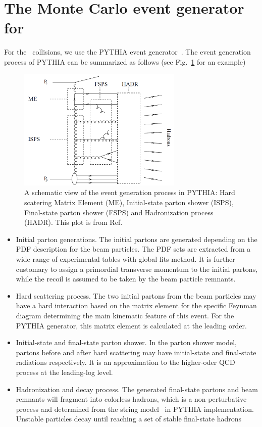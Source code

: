 \section{The Monte Carlo event generator for \ep\ } \label{sec:MC_ep}
For the \ep\ collisions, we use the PYTHIA event generator~\cite{Sjostrand:2006za}. The event generation
process of PYTHIA can be summarized as follows (see Fig.~\ref{fig:PYTHIA_generation_scheme} for an example)
\begin{figure}
\centering
\includegraphics[width=0.7\textwidth]{plots/chpt5/PYTHIA_generation_scheme.png} 
\caption[Event generation in PYTHIA] {
A schematic view of the event generation process in PYTHIA: Hard scatering Matrix Element (ME), 
Initial-state parton shower (ISPS), Final-state parton shower (FSPS) and Hadronization process (HADR). 
This plot is from Ref.~\cite{Hansson:2007zz} }
\label{fig:PYTHIA_generation_scheme}
\end{figure}
\begin{itemize}
\item Initial parton generations. The initial partons are generated depending
on the PDF description for the beam particles. The PDF sets are extracted from
a wide range of experimental tables with global fits method. It is further customary to assign a primordial transverse momentum to the initial partons, while the recoil is assumed to be taken by the beam particle remnants. 
\item Hard scattering process. The two initial partons from the beam particles may
have a hard interaction based on the matrix element for the specific Feynman diagram
determining the main kinematic feature of this event. For the PYTHIA generator, this
matrix element is calculated at the leading order.
\item Initial-state and final-state parton shower. In the parton shower model, partons
before and after hard scattering may have initial-state and final-state radiations respectively. It
is an approximation to the higher-oder QCD process at the leading-log level. 
\item Hadronization and decay process. The generated final-state partons and
beam remnants will fragment into colorless hadrons, which is a non-perturbative process
and determined from the string model~\cite{Andersson:1983ia} in PYTHIA implementation. Unstable particles decay
until reaching a set of stable final-state hadrons
\end{itemize}

